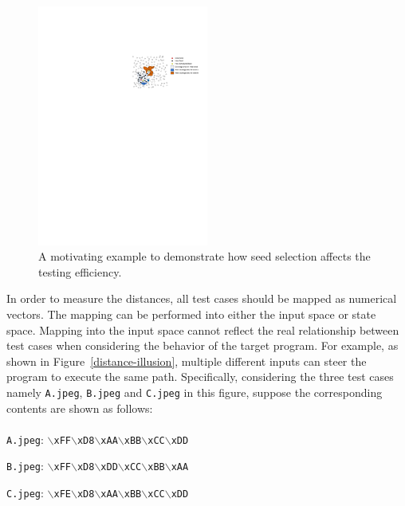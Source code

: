 \begin{figure}[!t]
\centering
\includegraphics[width=0.5\textwidth]{figures/motivate-example.pdf} 
\caption{A motivating example to demonstrate how seed selection  
	affects the testing efficiency.}\label{motivate-example}
\end{figure}
In order to measure the distances, all test cases should be mapped 
as numerical vectors. 
The mapping can be performed into either the input space or state space. 
Mapping into the input space cannot reflect the real relationship between 
test cases when considering the behavior of the target program. 
For example, as shown in Figure~\ref{distance-illusion}, multiple different 
inputs can steer the program to execute the same path. Specifically, 
considering the three test cases namely \texttt{A.jpeg}, \texttt{B.jpeg} 
and \texttt{C.jpeg} in this figure, suppose the corresponding contents 
are shown as follows:
\\
\\
\indent\texttt{A.jpeg}: \texttt{$\backslash$xFF$\backslash$xD8$\backslash$xAA$\backslash$xBB$\backslash$xCC$\backslash$xDD}

\texttt{B.jpeg}: \texttt{$\backslash$xFF$\backslash$xD8$\backslash$xDD$\backslash$xCC$\backslash$xBB$\backslash$xAA}

\texttt{C.jpeg}: \texttt{$\backslash$xFE$\backslash$xD8$\backslash$xAA$\backslash$xBB$\backslash$xCC$\backslash$xDD}
\\

